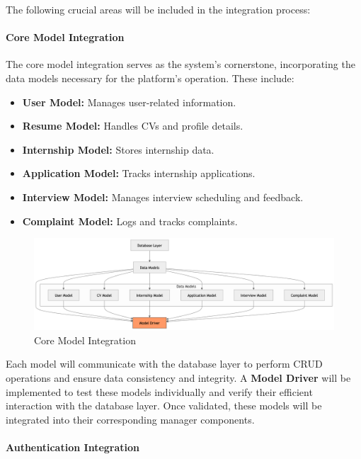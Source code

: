 The following crucial areas will be included in the integration process:

\paragraph{Core Model Integration}

The core model integration serves as the system's cornerstone, incorporating the data models necessary for the platform's operation. These include:
\begin{itemize}
    \item \textbf{User Model:} Manages user-related information.
    \item \textbf{Resume Model:} Handles CVs and profile details.
    \item \textbf{Internship Model:} Stores internship data.
    \item \textbf{Application Model:} Tracks internship applications.
    \item \textbf{Interview Model:} Manages interview scheduling and feedback.
    \item \textbf{Complaint Model:} Logs and tracks complaints.
\end{itemize}
\begin{figure}[H]
    \begin{center}
        \includegraphics[width=0.79\linewidth]{JhaBhatiaSharma/imagesDD/CoreModelIntegration.png}
        \caption{Core Model Integration}
        \label{fig:coreModelIntegration}
    \end{center}
\end{figure}
Each model will communicate with the database layer to perform CRUD operations and ensure data consistency and integrity. A \textbf{Model Driver} will be implemented to test these models individually and verify their efficient interaction with the database layer. Once validated, these models will be integrated into their corresponding manager components.

\paragraph{Authentication Integration}

